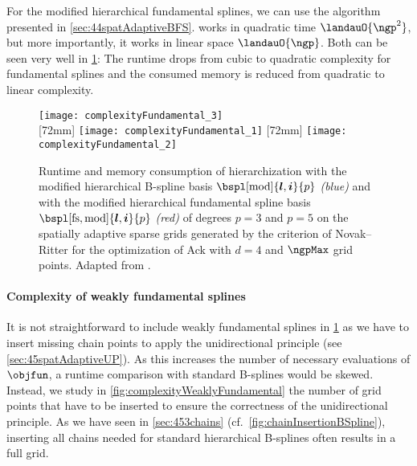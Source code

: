 For the modified hierarchical fundamental splines,
we can use the \bfs algorithm presented in \cref{sec:44spatAdaptiveBFS}.
\bfs works in quadratic time $\landauO{\ngp^2}$, but more importantly,
it works in linear space $\landauO{\ngp}$.
Both can be seen very well in \cref{fig:complexityFundamental}:
The runtime drops from cubic to quadratic complexity for fundamental splines
and the consumed memory is reduced from quadratic to linear complexity.

\begin{figure}
  \texttt{[image: complexityFundamental\_3]}\\[2mm]%
  [72mm]{%
    \texttt{[image: complexityFundamental\_1]}%
  }%
  \hfill%
  [72mm]{%
    \texttt{[image: complexityFundamental\_2]}%
  }%
  \caption[Complexity of fundamental splines]{%
    Runtime and memory consumption of hierarchization
    with the modified hierarchical B-spline basis
    $\bspl[\modified]{\*l,\*i}{p}$ \emph{\textcolor{C0}{(blue)}} and
    with the modified hierarchical fundamental spline basis
    $\bspl[\fs,\modified]{\*l,\*i}{p}$ \emph{\textcolor{C1}{(red)}}
    of degrees $p = 3$ and $p = 5$
    on the spatially adaptive sparse grids generated by the criterion of
    Novak--Ritter for the optimization of Ack with $d = 4$ and
    $\ngpMax$ grid points.
    Adapted from \cite{Valentin18Fundamental}.%
  }%
  \label{fig:complexityFundamental}%
\end{figure}

\paragraph{Complexity of weakly fundamental splines}

It is not straightforward to include weakly fundamental splines
in \cref{fig:complexityFundamental} as we have to insert missing
chain points to apply the unidirectional principle
(see \cref{sec:45spatAdaptiveUP}).
As this increases the number of necessary evaluations of $\objfun$,
a runtime comparison with standard B-splines would be skewed.
Instead, we study in \cref{fig:complexityWeaklyFundamental}
the number of grid points that have to be inserted
to ensure the correctness of the unidirectional principle.
As we have seen in \cref{sec:453chains}
(cf.\ \cref{fig:chainInsertionBSpline}),
inserting all chains needed for standard hierarchical B-splines
often results in a full grid.

